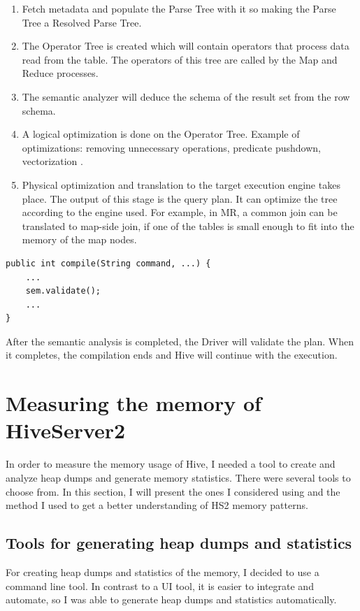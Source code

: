 \begin{enumerate}
	\item Fetch metadata and populate the Parse Tree with it so making the Parse Tree a Resolved Parse Tree.
	\item The Operator Tree is created which will contain operators that process data read from the table. The operators of this tree are called by the Map and Reduce processes.
	\item The semantic analyzer will deduce the schema of the result set from the row schema.
	\item A logical optimization is done on the Operator Tree. Example of optimizations: removing unnecessary operations, predicate pushdown, vectorization \etc.
	\item Physical optimization and translation to the target execution engine takes place. The output of this stage is the query plan. It can optimize the tree according to the engine used. For example, in MR, a common join can be translated to map-side join, if one of the tables is small enough to fit into the memory of the map nodes.
\end{enumerate}

\begin{lstlisting}
public int compile(String command, ...) {
	...
	sem.validate();
	...
}
\end{lstlisting}

After the semantic analysis is completed, the Driver will validate the plan. When it completes, the compilation ends and Hive will continue with the execution.

\section{Measuring the memory of HiveServer2}
In order to measure the memory usage of Hive, I needed a tool to create and analyze heap dumps and generate memory statistics. There were several tools to choose from. In this section, I will present the ones I considered using and the method I used to get a better understanding of HS2 memory patterns.

\subsection{Tools for generating heap dumps and statistics}
For creating heap dumps and statistics of the memory, I decided to use a command line tool. In contrast to a UI tool, it is easier to integrate and automate, so I was able to generate heap dumps and statistics automatically. 

